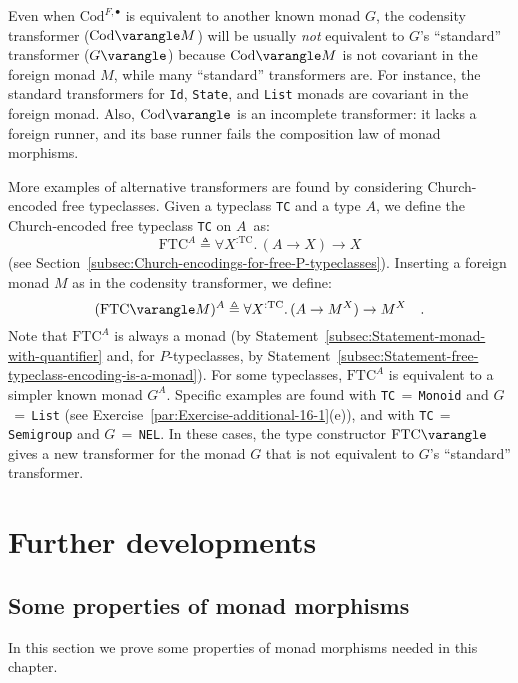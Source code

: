 Even when $\text{Cod}^{F,\bullet}$ is equivalent to another known
monad $G$, the codensity transformer ($\text{Cod}\varangle M$) will
be usually \emph{not} equivalent to $G$\textsf{'}s \textsf{``}standard\textsf{''} transformer
($G\varangle$) because $\text{Cod}\varangle M$ is not covariant
in the foreign monad $M$, while many \textsf{``}standard\textsf{''} transformers
are. For instance, the standard transformers for \lstinline!Id!,
\lstinline!State!, and \lstinline!List! monads are covariant in
the foreign monad. Also, $\text{Cod}\varangle$ is an incomplete transformer:
it lacks a foreign runner, and its base runner fails the composition
law of monad morphisms.

More examples of alternative transformers are found by considering
Church-encoded free typeclasses. Given a typeclass \lstinline!TC!
and a type $A$, we define the Church-encoded free typeclass \lstinline!TC!
on $A$~as:
\[
\text{FTC}^{A}\triangleq\forall X^{:\text{TC}}.\,(A\rightarrow X)\rightarrow X
\]
(see Section~\ref{subsec:Church-encodings-for-free-P-typeclasses}).
Inserting a foreign monad $M$ as in the codensity transformer, we
define:
\[
(\text{FTC}\varangle M)^{A}\triangleq\forall X^{:\text{TC}}.\,(A\rightarrow M^{X})\rightarrow M^{X}\quad.
\]
Note that $\text{FTC}^{A}$ is always a monad (by Statement~\ref{subsec:Statement-monad-with-quantifier}
and, for $P$-typeclasses, by Statement~\ref{subsec:Statement-free-typeclass-encoding-is-a-monad}).
For some typeclasses, $\text{FTC}^{A}$ is equivalent to a simpler
known monad $G^{A}$. Specific examples are found with \lstinline!TC!$\,=\,$\lstinline!Monoid!
and $G$$\,=\,$\lstinline!List! (see Exercise~\ref{par:Exercise-additional-16-1}(e)),
and with \lstinline!TC!$\,=\,$\lstinline!Semigroup! and $G$$\,=\,$\lstinline!NEL!.
In these cases,  the type constructor $\text{FTC}\varangle$ gives
a new transformer for the monad $G$ that is not equivalent to $G$\textsf{'}s
\textsf{``}standard\textsf{''} transformer.

\section{Further developments}

\subsection{Some properties of monad morphisms}

In this section we prove some properties of monad morphisms needed
in this chapter.


